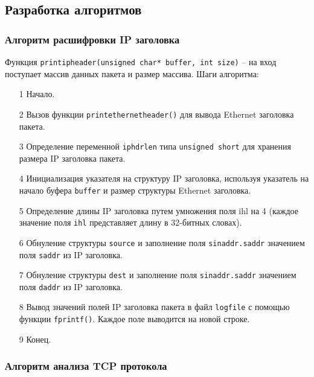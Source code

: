 \subsection{Разработка алгоритмов}
\subsubsection{Алгоритм расшифровки IP заголовка}

Функция \texttt{print{\textunderscore}ip{\textunderscore}header(unsigned char* buffer, int size)} -- на
вход поступает массив данных пакета и размер массива. Шаги алгоритма:
\begin{enumerate}
    \item[1] Начало.
    \item[2] Вызов функции \texttt{print{\textunderscore}ethernet{\textunderscore}header()} для вывода Ethernet
    заголовка пакета.
    \item[3] Определение переменной \texttt{iphdrlen} типа \texttt{unsigned short} для хранения
    размера IP заголовка пакета.
    \item[4] Инициализация указателя на структуру IP заголовка, используя
    указатель на начало буфера \texttt{buffer} и размер структуры Ethernet заголовка.
    \item[5] Определение длины IP заголовка путем умножения поля ihl на 4
    (каждое значение поля \texttt{ihl} представляет длину в 32-битных словах).
    \item[6] Обнуление структуры \texttt{source} и заполнение поля \texttt{sin{\textunderscore}addr.s{\textunderscore}addr}
    значением поля \texttt{saddr} из IP заголовка.
    \item[7] Обнуление структуры \texttt{dest} и заполнение поля \texttt{sin{\textunderscore}addr.s{\textunderscore}addr}
    значением поля \texttt{daddr} из IP заголовка.
    \item[8] Вывод значений полей IP заголовка пакета в файл \texttt{logfile} с помощью
    функции \texttt{fprintf()}\cite{lang_c}. Каждое поле выводится на новой строке.
    \item[9] Конец.
\end{enumerate}


\subsubsection{Алгоритм анализа TCP протокола}

